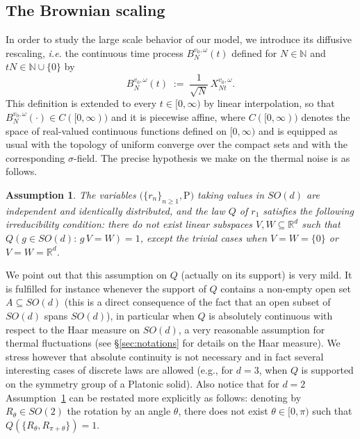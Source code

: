 \documentclass[a4paper,reqno,11pt]{amsart}
\numberwithin{equation}{section}
\newtheorem{assumption}[theorem]{Assumption}
\newcommand{\gs}{\sigma}
\newcommand{\go}{\omega}
\newcommand{\R}{\mathbb{R}}
\newcommand{\N}{\mathbb{N}}
\def\bP{\ensuremath{\bs{\mathrm{P}}}}
\def\bs{\boldsymbol}
\begin{document}
\smallskip


\smallskip

\subsection{The Brownian scaling}

In order to study the large scale behavior of our model,
we introduce its diffusive rescaling, {\sl i.e.} the
continuous time process $B_{N}^{v_0, \go}(t)$ defined for $N \in \N$
and $tN\in \N\cup \{0\}$ by
\begin{equation} \label{eq:BN}
	B_{N}^{v_0, \go}(t) \; :=\;
	\frac{1}{\sqrt N} \, X^{v_0, \omega}_{ Nt } .
\end{equation}
This definition is extended to every
$t \in [0, \infty)$ by linear interpolation,
so that $B_{N}^{v_0, \go}(\cdot)\in C([0,\infty))$ and it is piecewise affine,
where $C([0,\infty))$ denotes the space of
real-valued continuous functions defined on $[0,\infty)$ and is
equipped as usual with the topology of
uniform converge over the compact sets and with the
corresponding $\gs$-field. The precise hypothesis we make on
the thermal noise is as follows.

\medskip
\begin{assumption} \rm \label{ass:noise}
The variables $\big(\{r_n\}_{n\ge 1}, \bP \big)$ taking values in $SO(d)$ are independent
and identically distributed, and the
law $Q$ of $r_1$ satisfies the following irreducibility condition:
there do not exist linear subspaces $V, W \subseteq \R^d$ such that
$Q(g \in SO(d): \, g\, V = W) = 1$, except the trivial cases when
$V = W = \{0\}$ or $V = W = \R^d$.
\end{assumption}

\smallskip

\noindent
We point out that this assumption on $Q$ (actually on its support) is very mild.
It is fulfilled for instance whenever the
support of $Q$ contains a non-empty open set $A \subseteq SO(d)$
(this is a direct consequence of the fact that an open subset of $SO(d)$
spans $SO(d)$), in particular when
$Q$ is absolutely continuous with respect to the
Haar measure on $SO(d)$, a very reasonable
assumption for thermal fluctuations (see \S\ref{sec:notations}
for details on the Haar measure). We stress however that
absolute continuity is not necessary and in fact
several interesting cases of discrete laws are allowed (e.g.,
for $d=3$, when $Q$ is supported on the symmetry group of a Platonic solid).
Also notice that for $d=2$ Assumption~\ref{ass:noise} can be restated
more explicitly as follows: denoting by $R_{\theta} \in SO(2)$ the rotation by an
angle $\theta$, there does not exist $\theta \in [0,\pi)$ such
that $Q(\{R_{\theta}, R_{\pi + \theta}\})=1$.
\end{document}
